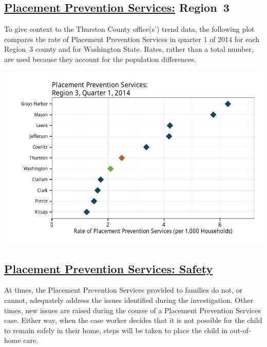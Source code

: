 \documentclass{article}\usepackage[]{graphicx}\usepackage[]{color}
\makeatletter
\def\maxwidth{ %
  \ifdim\Gin@nat@width>\linewidth
    \linewidth
  \else
    \Gin@nat@width
  \fi
}
\newenvironment{knitrout}{}{} %
\makeatother
\begin{document}
\subsection{\href{http://www.partnersforourchildren.org/data-portal/visualizations/home-services/trends}
    {Placement Prevention Services:} Region~3
}
To give context to the Thurston County office(s') trend data, the following plot compares the rate of Placement Prevention Services in quarter 1 of 2014 for each Region~3 county and for Washington State. Rates, rather than a total number, are used because they account for the population differences.
\nopagebreak[3]
\begin{knitrout}
\color{fgcolor}

{\centering \includegraphics[width=\maxwidth]{figure/ihs_context-1} 

}



\end{knitrout}

\newpage

\subsection{\href{http://www.partnersforourchildren.org/data-portal/visualizations/home-services/safety}
    {Placement Prevention Services: Safety}
}
At times, the Placement Prevention Services provided to families do not, or cannot, adequately address the issues identified during the investigation. Other times, new issues are raised during the course of a Placement Prevention Services case. Either way, when the case worker decides that it is not possible for the child to remain safely in their home, steps will be taken to place the child in out-of-home care.
\end{document}
